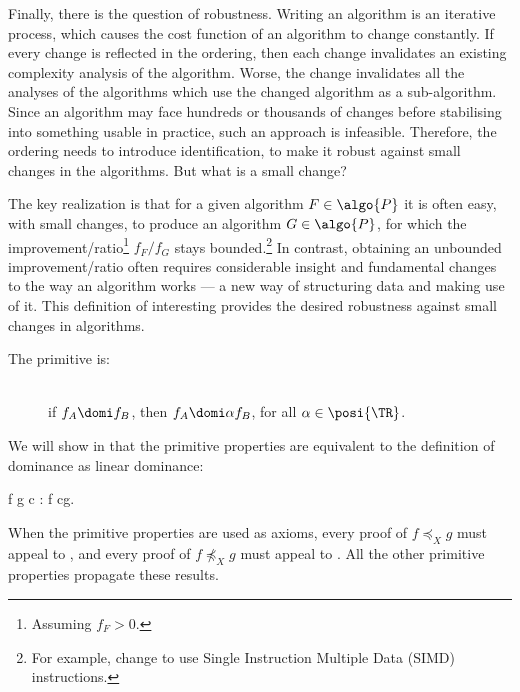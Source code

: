 \documentclass[b5paper, english, oneside]{memoir}
\begin{document}
Finally, there is the question of robustness. Writing an algorithm is an iterative process, which causes the cost function of an algorithm to change constantly. If every change is reflected in the ordering, then each change invalidates an existing complexity analysis of the algorithm. Worse, the change invalidates all the analyses of the algorithms which use the changed algorithm as a sub-algorithm. Since an algorithm may face hundreds or thousands of changes before stabilising into something usable in practice, such an approach is infeasible. Therefore, the ordering needs to introduce identification, to make it robust against small changes in the algorithms. But what is a small change?

The key realization is that for a given algorithm $F \in \algo{P}$ it is often easy, with small changes, to produce an algorithm $G \in \algo{P}$, for which the improvement\-/ratio\footnote{Assuming $f_F > 0$.} $f_F/f_G$ stays bounded.\footnote{For example, change to use Single Instruction Multiple Data (SIMD) instructions.} In contrast, obtaining an unbounded improvement\-/ratio often requires considerable insight and fundamental changes to the way an algorithm works --- a new way of structuring data and making use of it. This definition of interesting provides the desired robustness against small changes in algorithms. 

The primitive  is:
\begin{description}
\item[] \hfill \\ if $f_A \domi f_B$, then $f_A \domi \alpha f_B$, for all $\alpha \in \posi{\TR}$.
\end{description}

\begin{note}
We will show in  that the \nprim{} primitive properties are equivalent to the definition of dominance as linear dominance:
\begin{eqs}
f \preleq g \iff \exists c \in \posi{\TR}: f \leq cg.
\end{eqs}
\end{note}

\begin{note}
When the primitive properties are used as axioms, every proof of $f \preceq_X g$ must appeal to , and every proof of  $f \not\preceq_X g$ must appeal to . All the other primitive properties propagate these results.
\end{note}
\end{document}
